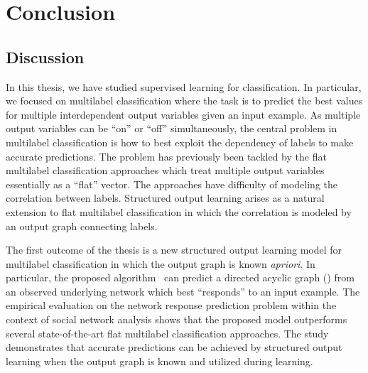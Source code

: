 {%
%
%
\chapter{Conclusion} \label{ch_conclusion}


\section{Discussion}

In this thesis, we have studied supervised learning for classification.
In particular, we focused on multilabel classification where the task is to predict the best values for multiple interdependent output variables given an input example.
As multiple output variables can be ``on'' or ``off'' simultaneously, the central problem in multilabel classification is how to best exploit the dependency of labels to make accurate predictions.
The problem has previously been tackled by the flat multilabel classification approaches which treat multiple output variables essentially as a ``flat'' vector.
The approaches have difficulty of modeling the correlation between labels.
Structured output learning arises as a natural extension to flat multilabel classification in which the correlation is modeled by an output graph connecting labels.

The first outcome of the thesis is a new structured output learning model for multilabel classification in which the output graph is known \textit{apriori}.
In particular, the proposed algorithm \spin\ can predict a directed acyclic graph (\daggraph) from an observed underlying network which best ``responds'' to an input example.
The empirical evaluation on the network response prediction problem within the context of social network analysis shows that the proposed model outperforms several state-of-the-art flat multilabel classification approaches.
The study demonstrates that accurate predictions can be achieved by structured output learning when the output graph is known and utilized during learning.

}

